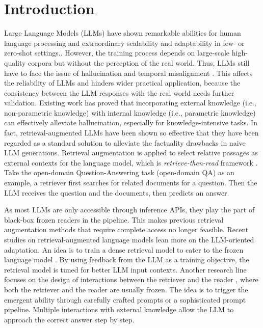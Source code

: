 \section{Introduction}
Large Language Models (LLMs) have shown remarkable abilities for human language processing and extraordinary scalability and adaptability in few- or zero-shot settings.\cite{ouyang2022training, brown2020language, chowdhery2022palm}.
However, the training process depends on large-scale high-quality corpora but without the perception of the real world. Thus, LLMs still have to face the issue of hallucination \cite{yao2023react, bang2023multitask} and temporal misalignment \cite{rottger-pierrehumbert-2021-temporal-adaptation, luu-etal-2022-time, jang2022temporalwiki}.
This affects the reliability of LLMs and hinders wider practical application, because the consistency between the LLM responses with the real world needs further validation.
Existing work has proved that incorporating external knowledge (i.e., non-parametric knowledge) with internal knowledge (i.e., parametric knowledge) can effectively alleviate hallucination, especially for knowledge-intensive tasks. 
In fact, retrieval-augmented LLMs have been shown so effective that they have been regarded as a standard solution to alleviate the factuality drawbacks in naive LLM generations. 
Retrieval augmentation is applied to select relative passages as external contexts for the language model, which is \textit{retrieve-then-read} framework  \cite{lewis2020rag, karpukhin-etal-2020-dense, atlas_few-shot_2022}.
Take the open-domain Question-Answering task (open-domain QA) as an example, a retriever first searches for related documents for a question. Then the LLM receives the question and the documents, then predicts an answer.

As most LLMs are only accessible through inference APIs, they play the part of black-box frozen readers in the pipeline.
This makes previous retrieval augmentation methods that require complete access \cite{lewis2020rag, guu2020realm, atlas_few-shot_2022} no longer feasible.
Recent studies on retrieval-augmented language models lean more on the LLM-oriented adaptation.
An idea is to train a dense retrieval model to cater to the frozen language model \cite{shi2023replug}.
By using feedback from the LLM as a training objective, the retrieval model is tuned for better LLM input contexts. 
Another research line focuses on the design of interactions between the retriever and the reader \cite{yao2023react, khattab2022dsp}, where both the retriever and the reader are usually frozen.
The idea is to trigger the emergent ability through carefully crafted prompts or a sophisticated prompt pipeline. 
Multiple interactions with external knowledge allow the LLM to approach the correct answer step by step.

